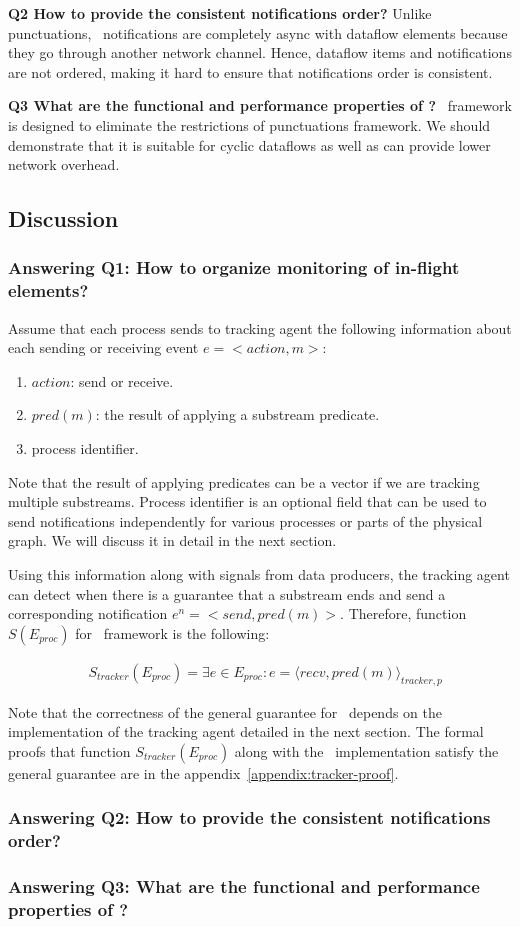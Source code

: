 {\bf Q2 How to provide the consistent notifications order?} Unlike punctuations, \tracker\ notifications are completely async with dataflow elements because they go through another network channel. Hence, dataflow items and notifications are not ordered, making it hard to ensure that notifications order is consistent.

{\bf Q3 What are the functional and performance properties of \tracker?} \tracker\ framework is designed to eliminate the restrictions of punctuations framework. We should demonstrate that it is suitable for cyclic dataflows as well as can provide lower network overhead.

\subsection{Discussion}

\subsubsection{Answering Q1: How to organize monitoring of in-flight elements?}
Assume that each process sends to tracking agent the following information about each sending or receiving event $e = <action,m>$:
\begin{enumerate}
    \item $action$: send or receive.
    \item $pred(m)$: the result of applying a substream predicate.
    \item process identifier.
\end{enumerate}

Note that the result of applying predicates can be a vector if we are tracking multiple substreams. Process identifier is an optional field that can be used to send notifications independently for various processes or parts of the physical graph. We will discuss it in detail in the next section.

Using this information along with signals from data producers, the tracking agent can detect when there is a guarantee that a substream ends and send a corresponding notification $e^{n} = <send,pred(m)>$. Therefore, function $S(E_{proc})$ for \tracker\ framework is the following:

\begin{align*}
& S_{tracker}(E_{proc}) = \exists e \in E_{proc} : e = \langle recv,pred(m)\rangle_{tracker,p}
\end{align*}

Note that the correctness of the general guarantee for \tracker\ depends on the implementation of the tracking agent detailed in the next section. The formal proofs that function $S_{tracker}(E_{proc})$ along with the \tracker\ implementation satisfy the general guarantee are in the appendix~\ref{appendix:tracker-proof}.

\subsubsection{Answering Q2: How to provide the consistent notifications order?}

\subsubsection{Answering Q3: What are the functional and performance properties of \tracker?}
